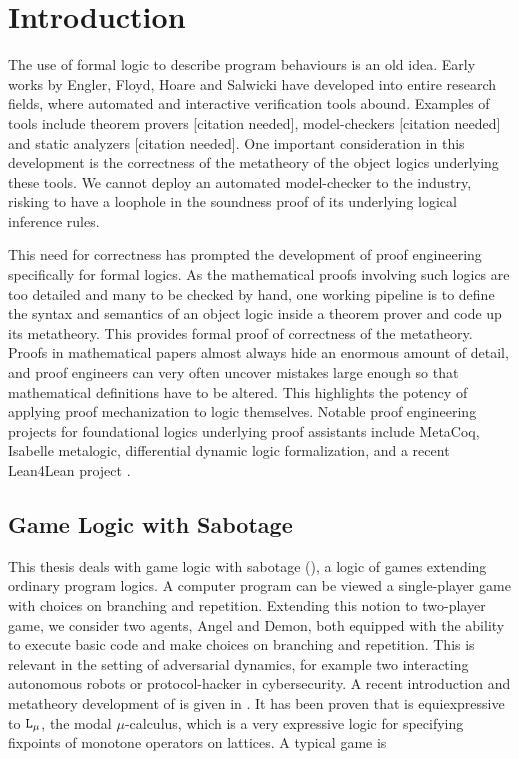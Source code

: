 
\chapter{Introduction} \label{chp:intro}
The use of formal logic to describe program behaviours is an old idea. Early works by Engler, Floyd, Hoare and Salwicki \cite{Engeler1959}\cite{Floyd1993}\cite{Hoare1969}\cite{Salwicki1970} have developed into entire research fields, where automated and interactive verification tools abound. Examples of tools include theorem provers [citation needed], model-checkers [citation needed] and static analyzers [citation needed]. One important consideration in this development is the correctness of the metatheory of the object logics underlying these tools. We cannot deploy an automated model-checker to the industry, risking to have a loophole in the soundness proof of its underlying logical inference rules.

This need for correctness has prompted the development of proof engineering specifically for formal logics. As the mathematical proofs involving such logics are too detailed and many to be checked by hand, one working pipeline is to define the syntax and semantics of an object logic inside a theorem prover and code up its metatheory. This provides formal proof of correctness of the metatheory. Proofs in mathematical papers almost always hide an enormous amount of detail, and proof engineers can very often uncover mistakes large enough so that mathematical definitions have to be altered. This highlights the potency of applying proof mechanization to logic themselves. Notable proof engineering projects for foundational logics underlying proof assistants include MetaCoq, Isabelle metalogic, differential dynamic logic formalization, and a recent Lean4Lean project \cite{Metacoq}\cite{Isabellemeta}\cite{formalDDL}.

\section{Game Logic with Sabotage}
\label{sec:intro_GLs}

This thesis deals with game logic with sabotage (\GLs{}), a logic of games extending ordinary program logics. A computer program can be viewed a single-player game with choices on branching and repetition. Extending this notion to two-player game, we consider two agents, Angel and Demon, both equipped with the ability to execute basic code and make choices on branching and repetition. This is relevant in the setting of adversarial dynamics, for example two interacting autonomous robots or protocol-hacker in cybersecurity. A recent introduction and metatheory development of \GLs{} is given in \cite{Wafa_2024}. It has been proven that \GLs{} is equiexpressive to $\texttt{L}_\mu{}$, the modal $\mu$-calculus, which is a very expressive logic for specifying fixpoints of monotone operators on lattices. A typical \GLs{} game is

